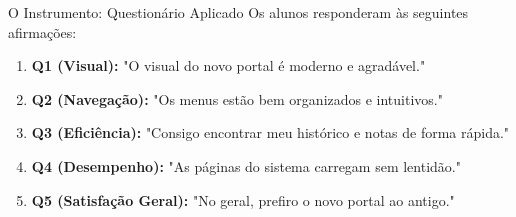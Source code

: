 \documentclass[aspectratio=169]{beamer}
\begin{document}
\begin{frame}{O Instrumento: Questionário Aplicado}
    Os alunos responderam às seguintes afirmações:
    \vspace{0.4cm}
    \begin{enumerate}
        \item \textbf{Q1 (Visual):} "O visual do novo portal é moderno e agradável."
        \item \textbf{Q2 (Navegação):} "Os menus estão bem organizados e intuitivos."
        \item \textbf{Q3 (Eficiência):} "Consigo encontrar meu histórico e notas de forma rápida."
        \item \textbf{Q4 (Desempenho):} "As páginas do sistema carregam sem lentidão."
        \item \textbf{Q5 (Satisfação Geral):} "No geral, prefiro o novo portal ao antigo."
    \end{enumerate}
\end{frame}
\end{document}
